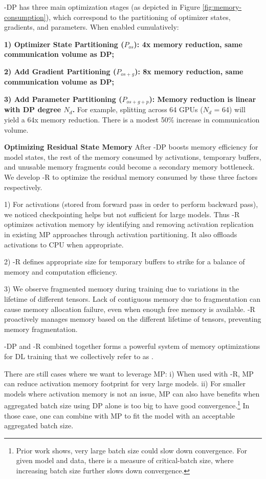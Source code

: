 \name-DP has three main optimization stages (as depicted in Figure \ref{fig:memory-consumption}), which correspond to the partitioning of optimizer states, gradients, and parameters. When enabled cumulatively:

\textbf{1) Optimizer State Partitioning ($P_{os}$): 4x memory reduction, same communication volume as DP;}

\textbf{2) Add Gradient Partitioning ($P_{os+g}$): 8x memory reduction, same communication volume as DP;} 

\textbf{3) Add Parameter Partitioning ($P_{os+g+p}$): Memory reduction is linear with DP degree $N_d$.} For example, splitting across 64 GPUs ($N_d$ = 64) will yield a 64x memory reduction. There is a modest 50\% increase in communication volume.

{\bf Optimizing Residual State Memory}
After \name-DP boosts memory efficiency for model states, the rest of the memory consumed by activations, temporary buffers, and unusable memory fragments could become a secondary memory bottleneck.  We develop \name-R to optimize the residual memory consumed by these three factors respectively.  

1) For activations (stored from forward pass in order to perform backward pass), we noticed checkpointing \cite{DBLP:journals/corr/ChenXZG16} helps but not sufficient for large models.  
Thus \name-R optimizes activation memory by identifying and removing activation replication in existing MP approaches through activation partitioning. It also offloads activations to CPU when appropriate.

2) \name-R defines appropriate size for temporary buffers to strike for a balance of memory and computation efficiency. 

3) We observe fragmented memory during training due to variations in the lifetime of different tensors. Lack of contiguous memory due to fragmentation can cause memory allocation failure, even when enough free memory is available. \name-R proactively manages memory based on the different lifetime of tensors, preventing memory fragmentation.

\name-DP and \name-R combined together forms a powerful system of memory optimizations for DL training that we collectively refer to as \name.

There are still cases where we want to leverage MP: i) When used with \name-R, MP can reduce activation memory footprint for very large models. ii) For smaller models where activation memory is not an issue, MP can also have benefits when aggregated batch size using DP alone is too big to have good convergence.\footnote{Prior work \cite{DBLP:journals/corr/batch-scaling} shows, very large batch size could slow down convergence.  For given model and data, there is a measure of critical-batch size, where increasing batch size further slows down convergence.}  In those case, one can combine \name with MP to fit the model with an acceptable aggregated batch size.

